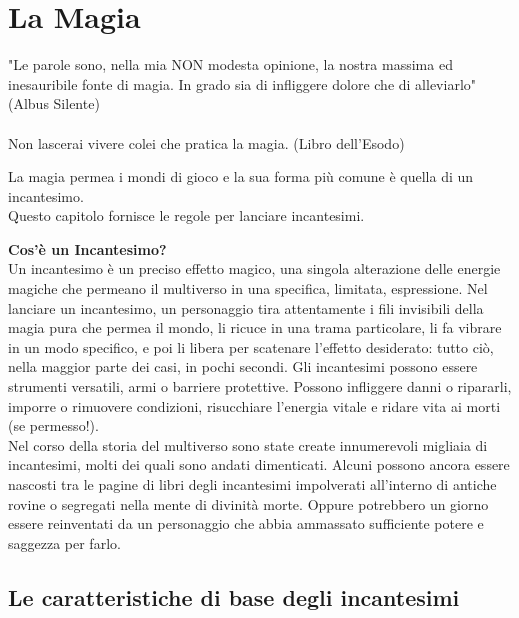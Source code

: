 \section{La Magia}


\label{la-magia}
\begin{tcolorbox}[enhanced,arc=5pt,boxrule=0.3pt]{
"Le parole sono, nella mia NON modesta opinione, la nostra massima ed inesauribile fonte di magia. In grado sia di infliggere dolore che di alleviarlo" (Albus Silente)\\\\
Non lascerai vivere colei che pratica la magia. (Libro dell'Esodo)} \end{tcolorbox} \medskip

La magia permea i mondi di gioco e la sua forma più comune è quella di un incantesimo.\\

Questo capitolo fornisce le regole per lanciare incantesimi. 

\medskip

\textbf{Cos’è un Incantesimo?}\\

Un incantesimo è un preciso effetto magico, una singola alterazione delle energie magiche che  permeano il multiverso in una specifica, limitata,  espressione. Nel lanciare un incantesimo, un  personaggio tira attentamente i fili invisibili della magia  pura che permea il mondo, li ricuce in una trama  particolare, li fa vibrare in un modo specifico, e poi li  libera per scatenare l'effetto desiderato: tutto ciò, nella  maggior parte dei casi, in pochi secondi.  Gli incantesimi possono essere strumenti versatili, armi  o barriere protettive. Possono infliggere danni o  ripararli, imporre o rimuovere condizioni, risucchiare l'energia vitale e ridare vita ai morti (se permesso!).\\

Nel corso della storia del multiverso sono state create  innumerevoli migliaia di incantesimi, molti dei quali sono  andati dimenticati. Alcuni possono ancora essere  nascosti tra le pagine di libri degli incantesimi  impolverati all'interno di antiche rovine o segregati nella  mente di divinità morte. Oppure potrebbero un giorno  essere reinventati da un personaggio che abbia  ammassato sufficiente potere e saggezza per farlo.\\

\subsection{Le caratteristiche di base degli incantesimi}

